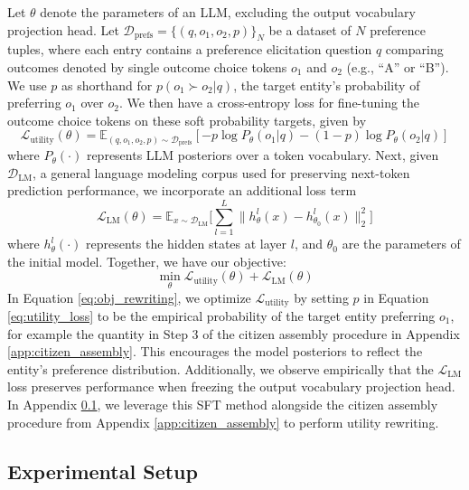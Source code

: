 Let $\theta$ denote the parameters of an LLM, excluding the output vocabulary projection head. Let $\mathcal{D}_\text{prefs} = \{(q, o_1, o_2, p)\}_N$ be a dataset of $N$ preference tuples, where each entry contains a preference elicitation question $q$ comparing outcomes denoted by single outcome choice tokens $o_1$ and $o_2$ (e.g., ``A'' or ``B''). We use $p$ as shorthand for $p(o_1 \succ o_2|q)$, the target entity's probability of preferring  $o_1$ over $o_2$. We then have a cross-entropy loss for fine-tuning the outcome choice tokens on these soft probability targets, given by
\begin{equation*}
\label{eq:utility_loss}
\mathcal{L}_{\text{utility}}(\theta) = \mathbb{E}_{(q,o_1,o_2,p) \sim \mathcal{D}_\text{prefs}}[ -p \log P_\theta(o_1|q) 
 - (1-p) \log P_\theta(o_2|q)]
\end{equation*}
where $P_\theta(\cdot)$ represents LLM posteriors over a token vocabulary. Next, given $\mathcal{D}_\text{LM}$, a general language modeling corpus used for preserving next-token prediction performance, we incorporate an additional loss term
\begin{equation*}
\mathcal{L}_{\text{LM}}(\theta) = \mathbb{E}_{x \sim \mathcal{D}_\text{LM}}\bigg[\! \sum_{l=1}^L \|h^l_\theta(x) - h^l_{\theta_0}(x)\|_2^2\bigg]
\end{equation*}
where $h^l_\theta(\cdot)$ represents the hidden states at layer $l$, and $\theta_0$ are the parameters of the initial model. Together, we have our objective:
\begin{equation}
\label{eq:obj_rewriting}
\min_\theta \mathcal{L}_{\text{utility}}(\theta) + \mathcal{L}_{\text{LM}}(\theta) 
\end{equation}
In Equation \ref{eq:obj_rewriting}, we optimize $\mathcal{L}_{\text{utility}}$ by setting $p$ in Equation \ref{eq:utility_loss} to be the empirical probability of the target entity preferring $o_1$, for example the quantity in Step $3$ of the citizen assembly procedure in Appendix \ref{app:citizen_assembly}. This encourages the model posteriors to reflect the entity's preference distribution. Additionally, we observe empirically that the $\mathcal{L}_{\text{LM}}$ loss preserves performance when freezing the output vocabulary projection head. In Appendix  \ref{app:util_control_exp_setup}, we leverage this SFT method alongside the citizen assembly procedure from Appendix \ref{app:citizen_assembly} to perform utility rewriting.

\subsection{Experimental Setup}
\label{app:util_control_exp_setup}

